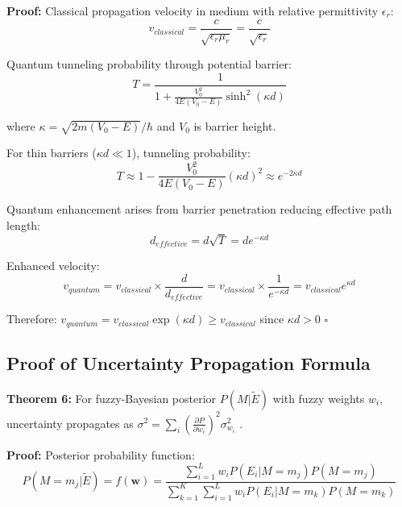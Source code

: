 \textbf{Proof:}
Classical propagation velocity in medium with relative permittivity $\epsilon_r$:
\begin{equation}
v_{classical} = \frac{c}{\sqrt{\epsilon_r \mu_r}} = \frac{c}{\sqrt{\epsilon_r}}
\end{equation}

Quantum tunneling probability through potential barrier:
\begin{equation}
T = \frac{1}{1 + \frac{V_0^2}{4E(V_0-E)} \sinh^2(\kappa d)}
\end{equation}

where $\kappa = \sqrt{2m(V_0-E)}/\hbar$ and $V_0$ is barrier height.

For thin barriers ($\kappa d \ll 1$), tunneling probability:
\begin{equation}
T \approx 1 - \frac{V_0^2}{4E(V_0-E)} (\kappa d)^2 \approx e^{-2\kappa d}
\end{equation}

Quantum enhancement arises from barrier penetration reducing effective path length:
\begin{equation}
d_{effective} = d \sqrt{T} = d e^{-\kappa d}
\end{equation}

Enhanced velocity:
\begin{equation}
v_{quantum} = v_{classical} \times \frac{d}{d_{effective}} = v_{classical} \times \frac{1}{e^{-\kappa d}} = v_{classical} e^{\kappa d}
\end{equation}

Therefore: $v_{quantum} = v_{classical} \exp(\kappa d) \geq v_{classical}$ since $\kappa d > 0$ $\square$

\subsection{Proof of Uncertainty Propagation Formula}

\textbf{Theorem 6:} For fuzzy-Bayesian posterior $P(M|\tilde{E})$ with fuzzy weights $w_i$, uncertainty propagates as $\sigma^2 = \sum_i \left(\frac{\partial P}{\partial w_i}\right)^2 \sigma_{w_i}^2$ \cite{bevington2003data}.

\textbf{Proof:}
Posterior probability function:
\begin{equation}
P(M = m_j | \tilde{E}) = f(\mathbf{w}) = \frac{\sum_{i=1}^L w_i P(E_i | M = m_j) P(M = m_j)}{\sum_{k=1}^K \sum_{i=1}^L w_i P(E_i | M = m_k) P(M = m_k)}
\end{equation}

